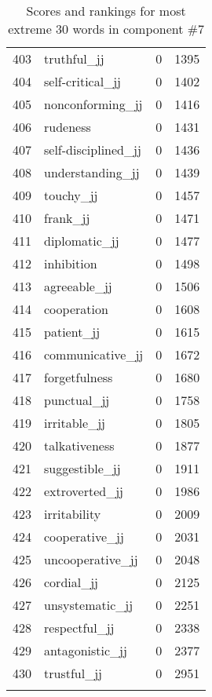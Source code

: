 \begin{longtable}[!htbp]{| rlr@{.}l |}
    403 & truthful\_jj & 0 & 1395 \\
    404 & self-critical\_jj & 0 & 1402 \\
    405 & nonconforming\_jj & 0 & 1416 \\
    406 & rudeness & 0 & 1431 \\
    407 & self-disciplined\_jj & 0 & 1436 \\
    408 & understanding\_jj & 0 & 1439 \\
    409 & touchy\_jj & 0 & 1457 \\
    410 & frank\_jj & 0 & 1471 \\
    411 & diplomatic\_jj & 0 & 1477 \\
    412 & inhibition & 0 & 1498 \\
    413 & agreeable\_jj & 0 & 1506 \\
    414 & cooperation & 0 & 1608 \\
    415 & patient\_jj & 0 & 1615 \\
    416 & communicative\_jj & 0 & 1672 \\
    417 & forgetfulness & 0 & 1680 \\
    418 & punctual\_jj & 0 & 1758 \\
    419 & irritable\_jj & 0 & 1805 \\
    420 & talkativeness & 0 & 1877 \\
    421 & suggestible\_jj & 0 & 1911 \\
    422 & extroverted\_jj & 0 & 1986 \\
    423 & irritability & 0 & 2009 \\
    424 & cooperative\_jj & 0 & 2031 \\
    425 & uncooperative\_jj & 0 & 2048 \\
    426 & cordial\_jj & 0 & 2125 \\
    427 & unsystematic\_jj & 0 & 2251 \\
    428 & respectful\_jj & 0 & 2338 \\
    429 & antagonistic\_jj & 0 & 2377 \\
    430 & trustful\_jj & 0 & 2951 \\
    \hline
    \caption{Scores and rankings for most extreme 30 words in component \#7} \\
\end{longtable}
